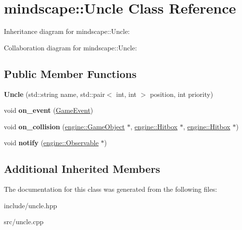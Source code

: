 \hypertarget{classmindscape_1_1_uncle}{}\section{mindscape\+:\+:Uncle Class Reference}
\label{classmindscape_1_1_uncle}


Inheritance diagram for mindscape\+:\+:Uncle\+:


Collaboration diagram for mindscape\+:\+:Uncle\+:
\subsection*{Public Member Functions}
\begin{DoxyCompactItemize}
\item 
{\bfseries Uncle} (std\+::string name, std\+::pair$<$ int, int $>$ position, int priority)\hypertarget{classmindscape_1_1_uncle_a82e6c0ce316c1c3f7a9620b639907239}{}\label{classmindscape_1_1_uncle_a82e6c0ce316c1c3f7a9620b639907239}

\item 
void {\bfseries on\+\_\+event} (\hyperlink{class_game_event}{Game\+Event})\hypertarget{classmindscape_1_1_uncle_aa85eb4ff4b7b6ed6e1e275259542a43c}{}\label{classmindscape_1_1_uncle_aa85eb4ff4b7b6ed6e1e275259542a43c}

\item 
void {\bfseries on\+\_\+collision} (\hyperlink{classengine_1_1_game_object}{engine\+::\+Game\+Object} $\ast$, \hyperlink{classengine_1_1_hitbox}{engine\+::\+Hitbox} $\ast$, \hyperlink{classengine_1_1_hitbox}{engine\+::\+Hitbox} $\ast$)\hypertarget{classmindscape_1_1_uncle_a363b3577c79c88a0e0d13a907723778c}{}\label{classmindscape_1_1_uncle_a363b3577c79c88a0e0d13a907723778c}

\item 
void {\bfseries notify} (\hyperlink{classengine_1_1_observable}{engine\+::\+Observable} $\ast$)\hypertarget{classmindscape_1_1_uncle_a9bf90a2b110d3d4b6c9b792bc9988999}{}\label{classmindscape_1_1_uncle_a9bf90a2b110d3d4b6c9b792bc9988999}

\end{DoxyCompactItemize}
\subsection*{Additional Inherited Members}


The documentation for this class was generated from the following files\+:\begin{DoxyCompactItemize}
\item 
include/uncle.\+hpp\item 
src/uncle.\+cpp\end{DoxyCompactItemize}
